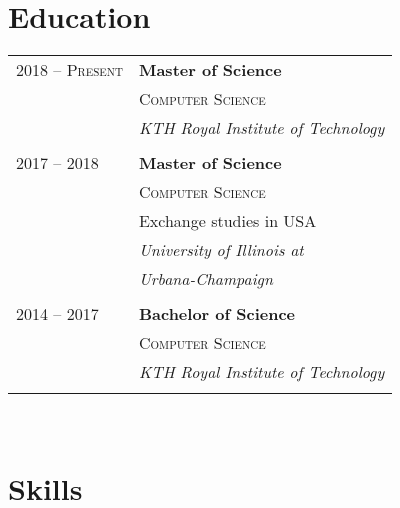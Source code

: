 \documentclass[11pt]{article} %
\begin{document}
{\begin{minipage}[t]{0.44\textwidth}

\section{Education} 

\begin{tabular}{ll} %


2018 -- \textsc{Present} & \textbf{Master of Science} \\ 
& \textsc{Computer Science} \\ 
& \textit{KTH Royal Institute of Technology}\\
&\\
	 
2017 -- 2018 & \textbf{Master of Science} \\ 
& \textsc{Computer Science} \\ 
& \small Exchange studies in USA\\
& \textit{University of Illinois at} \\
& \textit{Urbana-Champaign} \\
&\\

2014 -- 2017 & \textbf{Bachelor of Science} \\ 
& \textsc{Computer Science} \\ 
& \textit{KTH Royal Institute of Technology}\\
&\\
	

\end{tabular}\\[10pt]


\section{Skills} 


\end{minipage}}
\end{document}
